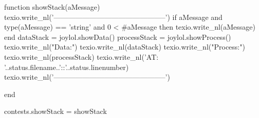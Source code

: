 \def\setJoylolShowStackOff{
  \directlua{thirddata.joylol.setShowStack(false)}
}

\def\setJoylolShowSpecificationsOn{
  \directlua{thirddata.joylol.setShowSpecifications(true)}
}

\def\setJoylolShowSpecificationsOff{
  \directlua{thirddata.joylol.setShowSpecifications(false)}
}

\def\setJoylolCheckingOn{
  \directlua{thirddata.joylol.setChecking(true)}
}

\def\setJoylolCheckingOff{
  \directlua{thirddata.joylol.setChecking(false)}
}
\stopMkIVCode

\startLuaCode
function showStack(aMessage) 
  texio.write_nl('-----------------------------------------------')
  if aMessage and type(aMessage) == 'string' and 0 < #aMessage then
    texio.write_nl(aMessage)
  end
  dataStack    = joylol.showData()
  processStack = joylol.showProcess()
  texio.write_nl("Data:")
  texio.write_nl(dataStack)
  texio.write_nl("Process:")
  texio.write_nl(processStack)
  texio.write_nl('AT: '..status.filename..'::'..status.linenumber)
  texio.write_nl('-----------------------------------------------')

end

contests.showStack = showStack
\stopLuaCode
